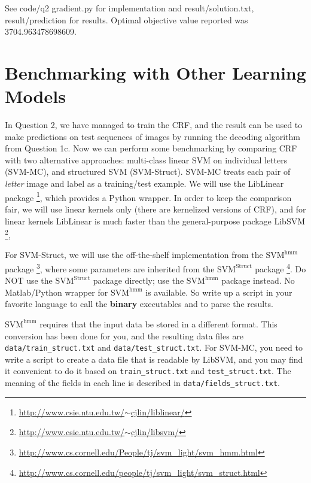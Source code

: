 \documentclass[11pt]{report}
\begin{document}
\textcolor{b}{See code/q2 gradient.py for implementation and result/solution.txt, result/prediction for
results. Optimal objective value reported was 3704.963478698609.}


\section{Benchmarking with Other Learning Models}

In Question 2, we have managed to train the CRF,
and the result can be used to make predictions on test sequences of images by running the decoding algorithm from Question 1c. 
Now we can perform some benchmarking by comparing CRF with two alternative approaches:
multi-class linear SVM on individual letters (SVM-MC),
and structured SVM (SVM-Struct).
SVM-MC treats each pair of \emph{letter} image and label as a training/test example.
We will use the LibLinear package%
\footnote{\href{http://www.csie.ntu.edu.tw/~cjlin/liblinear/}{http://www.csie.ntu.edu.tw/$\sim$cjlin/liblinear/}},
which provides a Python wrapper.
In order to keep the comparison fair,
we will use linear kernels only (there are kernelized versions of CRF),
and for linear kernels LibLinear is much faster than the general-purpose package LibSVM%
\footnote{\href{http://www.csie.ntu.edu.tw/~cjlin/libsvm/}{http://www.csie.ntu.edu.tw/$\sim$cjlin/libsvm/}},


For SVM-Struct, we will use the off-the-shelf implementation from the $\text{SVM}^{\text{hmm}}$ package%
\footnote{\href{http://www.cs.cornell.edu/People/tj/svm_light/svm_hmm.html}{http://www.cs.cornell.edu/People/tj/svm\_light/svm\_hmm.html}},
where some parameters are inherited from the $\text{SVM}^{\text{Struct}}$ package%
\footnote{\href{http://www.cs.cornell.edu/people/tj/svm_light/svm_struct.html}{http://www.cs.cornell.edu/people/tj/svm\_light/svm\_struct.html}}.
Do NOT use the $\text{SVM}^{\text{Struct}}$ package directly; 
use the $\text{SVM}^{\text{hmm}}$ package instead.
No Matlab/Python wrapper for $\text{SVM}^{\text{hmm}}$ is available.
So write up a script in your favorite language to call the \textbf{binary} executables and to parse the results.

$\text{SVM}^{\text{hmm}}$ requires that the input data be stored in a different format.
This conversion has been done for you, and the resulting data files are \verb#data/train_struct.txt# and \verb#data/test_struct.txt#.
For SVM-MC, you need to write a script to create a data file that is readable by LibSVM,
and you may find it convenient to do it based on \verb#train_struct.txt# and \verb#test_struct.txt#.
The meaning of the fields in each line is described in \verb#data/fields_struct.txt#.
\end{document}
